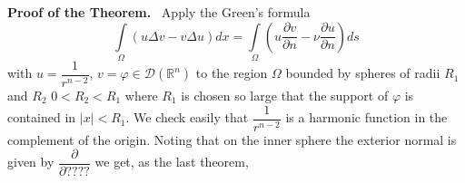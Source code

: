 \noindent
{\bf Proof of the Theorem.}~
Apply the Green's formula
$$
\int\limits_{\Omega}(u\Delta v-v\Delta u)dx=\int\limits_{\Omega}\left(u\dfrac{\partial v}{\partial n}-\nu \frac{\partial u}{\partial n}\right)ds
$$
with $u=\dfrac{1}{r^{n-2}}$, $v=\varphi\in \mathcal{D}(\mathbb{R}^{n})$ to the region $\Omega$ bounded by spheres of radii $R_{1}$ and $R_{2}$ $0<R_{2}<R_{1}$ where $R_{1}$ is chosen so large that the support of $\varphi$ is contained in $|x|<R_{1}$. We check easily that $\dfrac{1}{r^{n-2}}$ is a harmonic function in the complement of the origin. Noting that on the inner sphere the exterior normal is given by $\dfrac{\partial}{\partial ????}$ we get, as the last theorem,
